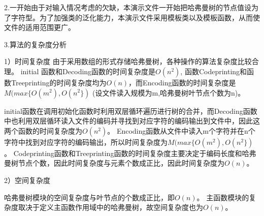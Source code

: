 \documentclass[paper=a4,UTF8,fontsize=11pt]{scrartcl} %
\numberwithin{equation}{section} %
\numberwithin{figure}{section} %
\numberwithin{table}{section} %
\begin{document}
2.一开始由于对输入情况考虑的欠缺，本演示文件一开始把哈弗曼树的节点值设为了字符型。为了加强类的泛化能力，本演示文件采用模板类以及模板函数，从而使文件的适用范围更广。

3.算法的复杂度分析

1）时间复杂度
由于采用数组的形式存储哈弗曼树，各种操作的算法复杂度比较合理。
initial 函数和Decoding函数的时间复杂度是$O(n^{2})$, 函数Codeprinting和函数Treeprinting的时间复杂度均为$O(n)$，而Encoding函数的时间复杂度是$M(max\{O(m^{2}),O(n^{2}\})$
(设文件读入规模为m,哈弗曼树叶节点个数为n)。

initial函数在调用初始化函数时利用双层循环遍历进行树的合并，而Decoding函数中也利用双层循环读入文件的编码并寻找到对应字符的编码输出到文件中，因此这两个函数的时间复杂度为$O(n^{2})$。
Encoding函数从文件中读入m个字符并在n个字符中找到对应字符的编码输出，所以时间复杂度为$M(max\{O(m^{2}),O(n^{2}\})$。
Codeprinting函数和Treeprinting函数的时间复杂度主要决定于编码长度和哈弗曼树节点个数，因此时间复杂度与元素个数成正比，因此时间复杂度为$O(n)$。

2）空间复杂度

哈弗曼树模块的空间复杂度与叶节点的个数成正比，即$O(n)$。
主函数模块的复杂度取决于定义主函数作用域中的哈弗曼树，故空间复杂度也为$O(n)$。
\vspace{0.5cm}
\end{document}
